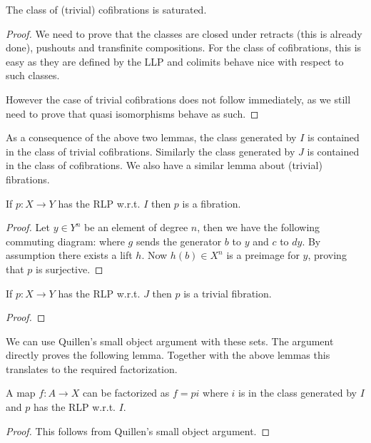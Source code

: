 \begin{lemma}
	The class of (trivial) cofibrations is saturated.
\end{lemma}
\begin{proof}
	We need to prove that the classes are closed under retracts (this is already done), pushouts and transfinite compositions. For the class of cofibrations, this is easy as they are defined by the LLP and colimits behave nice with respect to such classes. 

	However the case of trivial cofibrations does not follow immediately, as we still need to prove that quasi isomorphisms behave as such.
\end{proof}

As a consequence of the above two lemmas, the class generated by $I$ is contained in the class of trivial cofibrations. Similarly the class generated by $J$ is contained in the class of cofibrations. We also have a similar lemma about (trivial) fibrations.

\begin{lemma}
	If $p: X \to Y$ has the RLP w.r.t. $I$ then $p$ is a fibration.
\end{lemma}
\begin{proof}
	Let $y \in Y^n$ be an element of degree $n$, then we have the following commuting diagram:
	where $g$ sends the generator $b$ to $y$ and $c$ to $dy$. By assumption there exists a lift $h$. Now $h(b) \in X^n$ is a preimage for $y$, proving that $p$ is surjective.
\end{proof}

\begin{lemma}
	If $p: X \to Y$ has the RLP w.r.t. $J$ then $p$ is a trivial fibration.
\end{lemma}
\begin{proof}
\end{proof}

We can use Quillen's small object argument with these sets. The argument directly proves the following lemma. Together with the above lemmas this translates to the required factorization. 

\begin{lemma}
	A map $f: A \to X$ can be factorized as $f = pi$ where $i$ is in the class generated by $I$ and $p$ has the RLP w.r.t. $I$.
\end{lemma}
\begin{proof}
	This follows from Quillen's small object argument.
\end{proof}

